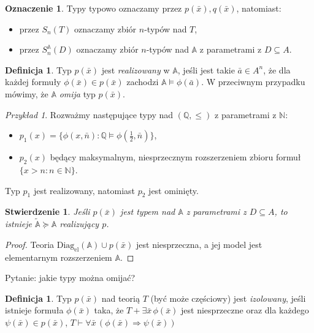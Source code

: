\documentclass{article}
\newcommand{\N}{\mathbb{N}}
\newcommand{\Q}{\mathbb{Q}}
\newcommand{\A}{\mathbb{A}}
\theoremstyle{plain}
\newtheorem{stw}[thm]{Stwierdzenie}
\theoremstyle{definition}
\newtheorem{df}[thm]{Definicja}
\newtheorem{ozn}[thm]{Oznaczenie}
\theoremstyle{remark}
\newtheorem{prz}[thm]{Przykład}
\newcommand{\DiagEl}{\text{Diag}_{\text{el}}}
\begin{document}
\begin{ozn}
	Typy typowo oznaczamy przez $p(\bar{x}), q(\bar{x})$, natomiast:
	 ~\begin{itemize}
		 \item przez $S_n(T)$ oznaczamy zbiór $n$-typów nad $T$,
		 \item przez $S_n^{\A}(D)$ oznaczamy zbiór $n$-typów nad $\A$ z parametrami z $D \subseteq A$.
	 \end{itemize}
\end{ozn}

\begin{df}
	Typ $p(\bar{x})$ jest \textit{realizowany} w $\A$, jeśli jest takie $\bar{a} \in A^n$, że dla każdej formuły $\phi(\bar{x}) \in p(\bar{x})$ zachodzi $\A \models \phi(\bar{a})$.
	W przeciwnym przypadku mówimy, że $\A$ \textit{omija} typ $p(\bar{x})$.
\end{df}

\begin{prz}
	Rozważmy następujące typy nad $(\Q, \leq)$ z parametrami z $\N$:
	\begin{itemize}
		\item $p_1(x) = \{\phi(x, \bar{n}) \colon \Q \models \phi(\frac{1}{2}, \bar{n})\}$,
		\item $p_2(x)$ będący maksymalnym, niesprzecznym rozszerzeniem zbioru formuł $\{x > n \colon n \in \N\}$.
	\end{itemize}
	Typ $p_1$ jest realizowany, natomiast $p_2$ jest ominięty.
\end{prz}

\begin{stw}
	Jeśli $p(\bar{x})$ jest typem nad $\A$ z parametrami z $D \subseteq A$,
	 to istnieje $\tilde{\A} \succcurlyeq \A$ realizujący $p$.
\end{stw}
\begin{proof}
	Teoria $\DiagEl(\A) \cup p(\bar{x})$ jest niesprzeczna, a jej model jest elementarnym rozszerzeniem $\A$.
\end{proof}


Pytanie: jakie typy można omijać?


\begin{df}
	Typ $p(\bar{x})$ nad teorią $T$ (być może częściowy) jest \textit{izolowany},
	jeśli istnieje formuła $\phi(\bar{x})$ taka, że $T + \exists \bar{x}\, \phi(\bar{x})$ jest niesprzeczne oraz dla każdego $\psi(\bar{x}) \in p(\bar{x})$, $T \vdash \forall \bar{x} \, (\phi(\bar{x}) \Rightarrow \psi(\bar{x}))$
\end{df}
\end{document}
